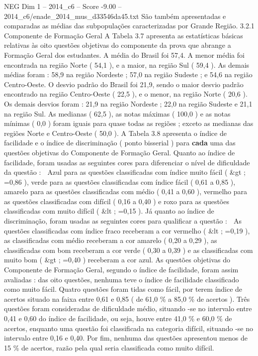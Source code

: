 \begin{textsample}{NEG Dim 1 – 2014\_c6 – Score -9.00 – 2014\_c6/enade\_2014\_mus\_d33546da45.txt}
São também apresentadas e comparadas as médias das subpopulações caracterizadas por Grande Região. 3.2.1 Componente de Formação Geral A Tabela 3.7 apresenta as estatísticas básicas relativas às oito questões objetivas do componente da prova que abrange a Formação Geral dos estudantes.
A média do Brasil foi 57,4.
A menor média foi encontrada na região Norte ( 54,1 ), e a maior, na região Sul ( 59,4 ).
As demais médias foram : 58,9 na região Nordeste ; 57,0 na região Sudeste ; e 54,6 na região Centro-Oeste.
O desvio padrão do Brasil foi 21,9, sendo o maior desvio padrão encontrado na região Centro-Oeste ( 22,5 ), e o menor, na região Norte ( 20,6 ).
Os demais desvios foram : 21,9 na região Nordeste ; 22,0 na região Sudeste e 21,1 na região Sul.
As medianas ( 62,5 ), as notas máximas ( 100,0 ) e as notas mínimas ( 0,0 ) foram iguais para quase todas as regiões ; exceto as medianas das regiões Norte e Centro-Oeste ( 50,0 ).
A Tabela 3.8 apresenta o índice de facilidade e o índice de discriminação ( ponto bisserial ) para \textbf{cada} uma das questões objetivas do Componente de Formação Geral.
Quanto ao índice de facilidade, foram usadas as seguintes cores para diferenciar o nível de dificuldade da questão :  Azul para as questões classificadas com índice muito fácil ( \&gt ; =0,86 ), verde para as questões classificadas com índice fácil ( 0,61 a 0,85 ), amarelo para as questões classificadas com médio ( 0,41 a 0,60 ), vermelho para as questões classificadas com difícil ( 0,16 a 0,40 ) e roxo para as questões classificadas com muito difícil ( \&lt ; =0,15 ).
Já quanto ao índice de discriminação, foram usadas as seguintes cores para qualificar a questão :  As questões classificadas com índice fraco receberam a cor vermelho ( \&lt ; =0,19 ), as classificadas com médio receberam a cor amarelo ( 0,20 a 0,29 ), as classificadas com bom receberam a cor verde ( 0,30 a 0,39 ) e as classificadas com muito bom ( \&gt ; =0,40 ) receberam a cor azul.
As questões objetivas do Componente de Formação Geral, segundo o índice de facilidade, foram assim avaliadas : das oito questões, nenhuma teve o índice de facilidade classificado como muito fácil.
Quatro questões foram tidas como fácil, por terem índice de acertos situado na faixa entre 0,61 e 0,85 ( de 61,0 \% a 85,0 \% de acertos ).
Três questões foram consideradas de dificuldade médio, situando -se no intervalo entre 0,41 e 0,60 do índice de facilidade, ou seja, houve entre 41,0 \% e 60,0 \% de acertos, enquanto uma questão foi classificada na categoria difícil, situando -se no intervalo entre 0,16 e 0,40.
Por fim, nenhuma das questões apresentou menos de 15 \% de acertos, razão pela qual seria classificada como muito difícil.

\end{textsample}
